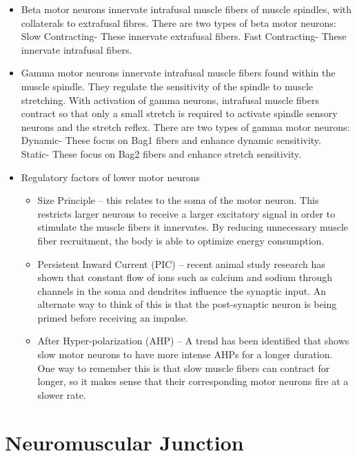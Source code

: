 \documentclass[]{book}
\providecommand{\tightlist}{%
  \setlength{\itemsep}{0pt}\setlength{\parskip}{0pt}}
\begin{document}
\begin{itemize}
\tightlist
\item
  Beta motor neurons innervate intrafusal muscle fibers of muscle spindles, with collaterals to extrafusal fibres. There are two types of beta motor neurons: Slow Contracting- These innervate extrafusal fibers. Fast Contracting- These innervate intrafusal fibers.
\item
  Gamma motor neurons innervate intrafusal muscle fibers found within the muscle spindle. They regulate the sensitivity of the spindle to muscle stretching. With activation of gamma neurons, intrafusal muscle fibers contract so that only a small stretch is required to activate spindle sensory neurons and the stretch reflex. There are two types of gamma motor neurons: Dynamic- These focus on Bag1 fibers and enhance dynamic sensitivity. Static- These focus on Bag2 fibers and enhance stretch sensitivity.
\item
  Regulatory factors of lower motor neurons

  \begin{itemize}
  \tightlist
  \item
    Size Principle -- this relates to the soma of the motor neuron. This restricts larger neurons to receive a larger excitatory signal in order to stimulate the muscle fibers it innervates. By reducing unnecessary muscle fiber recruitment, the body is able to optimize energy consumption.
  \item
    Persistent Inward Current (PIC) -- recent animal study research has shown that constant flow of ions such as calcium and sodium through channels in the soma and dendrites influence the synaptic input. An alternate way to think of this is that the post-synaptic neuron is being primed before receiving an impulse.
  \item
    After Hyper-polarization (AHP) -- A trend has been identified that shows slow motor neurons to have more intense AHPs for a longer duration. One way to remember this is that slow muscle fibers can contract for longer, so it makes sense that their corresponding motor neurons fire at a slower rate.
  \end{itemize}
\end{itemize}

\hypertarget{neuromuscular-junction}{%
\section{Neuromuscular Junction}\label{neuromuscular-junction}}
\end{document}

